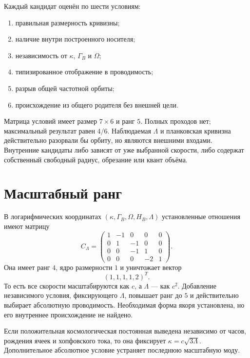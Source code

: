 Каждый кандидат оценён по шести условиям:
\begin{enumerate}
\item правильная размерность кривизны;
\item наличие внутри построенного носителя;
\item независимость от $\kappa$, $\Gamma_B$ и $\Omega$;
\item типизированное отображение в проводимость;
\item разрыв общей частотной орбиты;
\item происхождение из общего родителя без внешней цели.
\end{enumerate}

Матрица условий имеет размер $7\times6$ и ранг $5$. Полных проходов нет;
максимальный результат равен $4/6$. Наблюдаемая $\Lambda$ и планковская
кривизна действительно разорвали бы орбиту, но являются внешними входами.
Внутренние кандидаты либо зависят от уже выбранной скорости, либо содержат
собственный свободный радиус, обрезание или квант объёма.

\section{Масштабный ранг}

В логарифмических координатах
$(\kappa,\Gamma_B,\Omega,H_B,\Lambda)$ установленные отношения имеют матрицу
\begin{equation}
 C_\Lambda=
 \begin{pmatrix}
 1&-1&0&0&0\\
 0&1&-1&0&0\\
 0&0&-1&1&0\\
 0&0&0&-2&1
 \end{pmatrix}.
 \label{eq:v10-lambda-anchor-scale-map}
\end{equation}
Она имеет ранг $4$, ядро размерности $1$ и уничтожает вектор
\begin{equation}
 (1,1,1,1,2)^T.
 \label{eq:v10-lambda-anchor-scale-vector}
\end{equation}
То есть все скорости масштабируются как $c$, а $\Lambda$ --- как $c^2$.
Добавление независимого условия, фиксирующего $\Lambda$, повышает ранг до
$5$ и действительно выбирает абсолютную проводимость. Необходимая форма
якоря установлена, но его внутреннее происхождение не найдено.

\begin{theorem}
Если положительная космологическая постоянная выведена независимо от часов,
рождения ячеек и хопфовского тока, то она фиксирует
$\kappa=c\sqrt{3\Lambda}$. Дополнительное абсолютное условие устраняет
последнюю масштабную моду.
\end{theorem}

